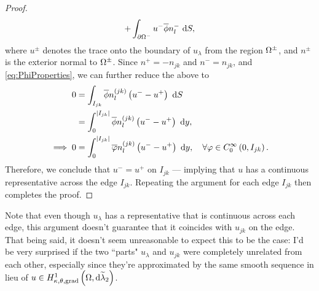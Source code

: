 \documentclass[11pt]{report}
\newcommand{\tlambda}{\widetilde{\lambda}}
\begin{document}
\begin{proof}
\begin{align*}
		+ \int_{\partial\Omega^-} u^-\overline{\phi}n^-_l  \ \mathrm{d}S,
	\end{align*}
	where $u^{\pm}$ denotes the trace onto the boundary of $u_{\lambda}$ from the region $\Omega^{\pm}$, and $n^{\pm}$ is the exterior normal to $\Omega^{\pm}$.
	Since $n^+ = -n_{jk}$ and $n^- = n_{jk}$, and \eqref{eq:PhiProperties}, we can further reduce the above to
	\begin{align*}
		0 &= \int_{I_{jk}} \overline{\phi}n^{(jk)}_l\left( u^- - u^+ \right)  \ \mathrm{d}S \\
		&= \int_0^{\left\lvert I_{jk} \right\rvert} \overline{\phi}n^{(jk)}_l\left( u^- - u^+ \right) \ \mathrm{d} y, \\
		\implies 0 &= \int_0^{\left\lvert I_{jk} \right\rvert} \overline{\varphi}n^{(jk)}_l\left( u^- - u^+ \right) \ \mathrm{d} y, \quad\forall\varphi\in C^{\infty}_{0}\left( 0, I_{jk} \right).
	\end{align*}
	Therefore, we conclude that $u^- = u^+$ on $I_{jk}$ --- implying that $u$ has a continuous representative across the edge $I_{jk}$.
	Repeating the argument for each edge $I_{jk}$ then completes the proof.
\end{proof}

Note that even though $u_\lambda$ has a representative that is continuous across each edge, this argument doesn't guarantee that it coincides with $u_{jk}$ on the edge.
That being said, it doesn't seem unreasonable to expect this to be the case: I'd be very surprised if the two ``parts" $u_\lambda$ and $u_{jk}$ were completely unrelated from each other, especially since they're approximated by the same smooth sequence in lieu of $u\in\ktgradSob{\ddom}{\tlambda_2}$.
\end{document}
